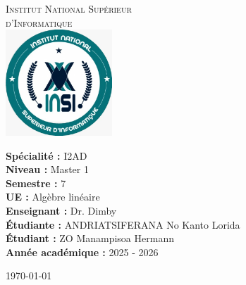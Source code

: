 \documentclass[12pt,a4paper]{article}
\begin{document}
	
	\begin{titlepage}
		\centering
		
		\textsc{\LARGE Institut National Supérieur\\[0.5cm] d'Informatique}\\[1.5cm]
		
		\includegraphics[width=0.3\textwidth]{logo.jpg}\\[1cm]
		
		
		
		\begin{center}
		\end{center}
        \vfill
		
		\begin{flushleft}
			\large
			\textbf{Spécialité :} I2AD\\
			\textbf{Niveau :} Master 1 \\
			\textbf{Semestre :} 7 \\
			\textbf{UE :} Algèbre linéaire  \\
			\textbf{Enseignant :} Dr. Dimby \\
			\textbf{Étudiante :} ANDRIATSIFERANA No Kanto Lorida\\
            \textbf{Étudiant :} ZO Manampisoa Hermann\\
			\textbf{Année académique :} 2025 - 2026
		\end{flushleft}
		
		\vspace{1cm}
		
		\begin{center}
			\today
		\end{center}
	\end{titlepage}
	
\end{document}
